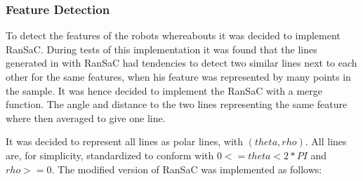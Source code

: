 \subsubsection{Feature Detection}
To detect the features of the robots whereabouts it was decided to implement RanSaC. During tests of this implementation it was found that the lines generated in with RanSaC had tendencies to detect two similar lines next to each other for the same features, when his feature was represented by many points in the sample. It was hence decided to implement the RanSaC with a merge function. The angle and distance to the two lines representing the same feature where then averaged to give one line.



It was decided to represent all lines as polar lines, with $ (theta, rho) $. All lines are, for simplicity, standardized to conform with $ 0 <= theta < 2*PI $ and $ rho >= 0 $. The modified version of RanSaC was implemented as follows:

